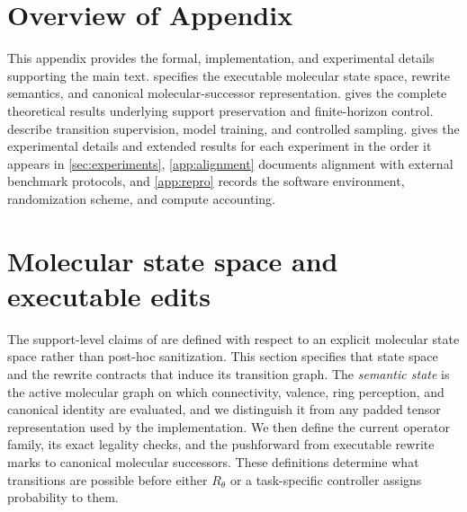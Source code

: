 
\section*{Overview of Appendix}

This appendix provides the formal, implementation, and experimental details supporting the main text.  specifies the executable molecular state space, rewrite semantics, and canonical molecular-successor representation.  gives the complete theoretical results underlying support preservation and finite-horizon control.  describe transition supervision, model training, and controlled sampling.  gives the experimental details and extended results for each experiment in the order it appears in \cref{sec:experiments}, \cref{app:alignment} documents alignment with external benchmark protocols, and \cref{app:repro} records the software environment, randomization scheme, and compute accounting.

\section{Molecular state space and executable edits}
\label{app:statespace}

The support-level claims of \method{} are defined with respect to an explicit molecular state space rather than post-hoc sanitization. This section specifies that state space and the rewrite contracts that induce its transition graph. The \emph{semantic state} is the active molecular graph on which connectivity, valence, ring perception, and canonical identity are evaluated, and we distinguish it from any padded tensor representation used by the implementation. We then define the current operator family, its exact legality checks, and the pushforward from executable rewrite marks to canonical molecular successors. These definitions determine what transitions are possible before either $R_\theta$ or a task-specific controller assigns probability to them.

